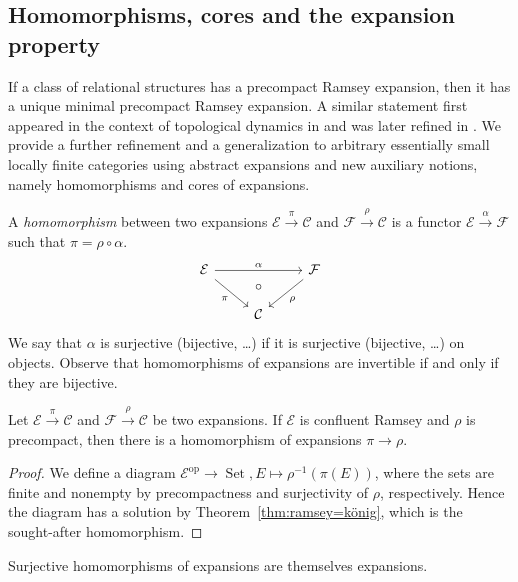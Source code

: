 \documentclass[preprint,12pt]{elsarticle}
\newcommand{\cat}[1]{\mathcal{#1}}
\newcommand{\op}{^{\mathop{op}}}
\DeclareMathOperator{\Set}{Set}
\begin{document}
\subsection{Homomorphisms, cores and the expansion property}
\label{subsec:expansions}

If a class of relational structures has a precompact Ramsey expansion, then it has a unique minimal precompact Ramsey expansion. A similar statement first appeared in the context of topological dynamics in \cite[Theorem~9.2, Theorem~10.7]{KPT2005} 
and was later refined in \cite[Theorem~6]{NVT2013precompactExpansions}. We provide a further refinement and a generalization to arbitrary essentially small locally finite categories using abstract expansions and new auxiliary notions, namely homomorphisms and cores of expansions.


\begin{defin}
\label{def:homs}
    A \emph{homomorphism} between two expansions $\cat E\xrightarrow{\pi}\cat C$ and $\cat F\xrightarrow{\rho}\cat C$ is a functor $\cat E\xrightarrow{\alpha}\cat F$ such that $\pi=\rho\circ\alpha$.
    $$
    \begin{tikzcd}
    \cat E \arrow[rd, "\pi"'] \arrow[rr, "\alpha", ""name=alpha] &        & \cat F \arrow[ld, "\rho"] \\
    & \cat C &
    \arrow[to=2-2, from=alpha, pos=.5, phantom, "\circ"]
    \end{tikzcd}
    $$
    We say that $\alpha$ is surjective (bijective, \dots) if it is surjective (bijective, \dots) on objects.
    Observe that homomorphisms of expansions are invertible if and only if they are bijective.
\end{defin}

\begin{lem}
\label{lem:ramseyHoms}
Let $\cat E\xrightarrow{\pi}\cat C$ and $\cat F\xrightarrow{\rho}\cat C$ be two expansions. If $\cat E$ is confluent Ramsey and $\rho$ is precompact, then there is a homomorphism of expansions $\pi\to\rho$.
\end{lem}

\begin{proof}
    We define a diagram $\cat E\op\to\Set, E\mapsto \rho^{-1}(\pi(E))$, where the sets are finite and nonempty by precompactness and surjectivity of $\rho$, respectively. Hence the diagram has a solution by Theorem~\ref{thm:ramsey=könig}, which is the sought-after homomorphism.
\end{proof}


\begin{lem}
\label{lem:surj}
    Surjective homomorphisms of expansions are themselves expansions.
\end{lem}
\end{document}
